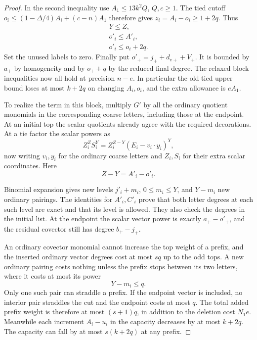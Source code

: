 \begin{proof}
In the second inequality use \(A_1\le13k^2Q\),
\(Q,c\ge1\). The tied cutoff
\(o_i\le(1-\Delta/4)A_i+(c-n)A_1\) therefore gives
\(z_i=A_i-o_i\ge 1+2q\). Thus \[
 \begin{gathered}
 Y\le Z, \\ o'_i\le A'_i, \\ o'_i\le o_i+2q.
\end{gathered}
\]
Set the unused labels to zero. Finally put
\(o'_+=j_++d_{v+}+V_+\). It is bounded by \(a_+\)
by homogeneity and by \(o_++q\) by the reduced final degree.
The relaxed block inequalities now all hold at precision
\(n-e\). In particular the old tied upper bound loses at
most \(k+2q\) on changing \(A_i,o_i\), and the extra
allowance is \(eA_1\).

To realize the term in this block, multiply \(G'\) by all the
ordinary quotient monomials in the corresponding coarse letters,
including those at the endpoint. At an initial top the scalar
quotients already agree with the required decorations. At a
tie factor the scalar powers as
\[
 Z_i^{Z}S_i^{Y}
       = Z_i^{Z-Y}(E_i-v_i\cdot y_i)^Y ,
\]
now writing \(v_i,y_i\) for the ordinary coarse letters and
\(Z_i,S_i\) for their extra scalar coordinates.
Here
\[
 Z-Y=A'_i-o'_i.
\]

Binomial expansion gives new levels
\(j'_i+m_i\), \(0\le m_i\le Y\), and
\(Y-m_i\) new ordinary pairings. The identities for
\(A'_i,C'_i\) prove that both letter degrees at each such level
are exact and that its level is allowed. They also check the
degrees in the initial list. At the endpoint the scalar vector
power is exactly \(a_+-o'_+\), and the residual covector still
has degree \(b_+-j_+\).

An ordinary covector monomial cannot increase the top weight
of a prefix, and the inserted ordinary vector degrees cost at
most \(s q\) up to the odd tops. A new ordinary pairing costs
nothing unless the prefix stops between its two letters, where
it costs at most its power
\[
 Y-m_i\le q.
\]
Only one such pair
can straddle a prefix. If the endpoint vector is included, no
interior pair straddles the cut and the endpoint costs at most
\(q\). The total added prefix weight is therefore at most
\((s+1)q\), in addition to the deletion cost \(N_1e\).
Meanwhile each increment \(A_i-u_i\) in the capacity decreases
by at most \(k+2q\). The capacity can fall by at most
\(s(k+2q)\) at any prefix.


\end{proof}

